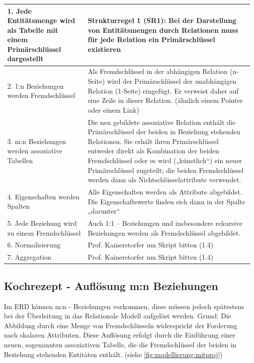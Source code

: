 \begin{center}
    \begin{tabular}{ | p{} | p{} | }
        \hline
        1. Jede Entitätsmenge wird als Tabelle mit einem Primärschlüssel dargestellt & Strukturregel 1 (SR1): Bei der Darstellung von Entitätsmengen durch Relationen muss für jede Relation ein Primärschlüssel existieren \\ \hline     
        2. 1:n Beziehungen werden Fremdschlüssel & Als Fremdschlüssel in der abhängigen Relation (n-Seite) wird der Primärschlüssel der unabhängigen Relation (1-Seite) eingefügt. 
        Er verweist daher auf eine Zeile in dieser Relation.
        (ähnlich einem Pointer oder einem Link) \\ \hline
        3. m:n Beziehungen werden assoziative Tabellen & Die neu gebildete assoziative Relation enthält die Primärschlüssel der beiden in Beziehung stehenden Relationen. Sie erhält ihren Primärschlüssel entweder direkt als Kombination der beiden Fremdschlüssel oder es wird („künstlich“) ein neuer Primärschlüssel zugeteilt; die beiden Fremdschlüssel werden dann als Nichtschlüsselattribute verwendet. \\ \hline
        4. Eigenschaften werden Spalten & Alle Eigenschaften werden als Attribute abgebildet. Die Eigenschaftswerte finden sich dann in der Spalte „darunter“. \\ \hline
        5. Jede Beziehung wird zu einem Fremdschlüssel & Auch 1:1 – Beziehungen und insbesondere rekursive Beziehungen werden als Fremdschlüssel abgebildet. \\ \hline
        6. Normalisierung & Prof. Kainerstorfer um Skript bitten (1.4) \\ \hline
        7. Aggregation & Prof. Kainerstorfer um Skript bitten (1.4) \\ \hline
    \end{tabular}
\end{center}

\subsection{Kochrezept - Auflösung m:n Beziehungen}

Im ERD können m:n - Beziehungen vorkommen, diese müssen jedoch spätestens bei der Überleitung in das Relationale Modell aufgelöst werden. Grund: Die Abbildung durch eine Menge von Fremdschlüsseln widerspricht der Forderung nach skalaren Attributen.
Diese Auflösung erfolgt durch die Einführung einer neuen, sogenannten assoziativen Tabelle, die die Fremdschlüssel der beiden in Beziehung stehenden Entitäten enthält. (siehe \ref{fig:modellierung:mitproj})

